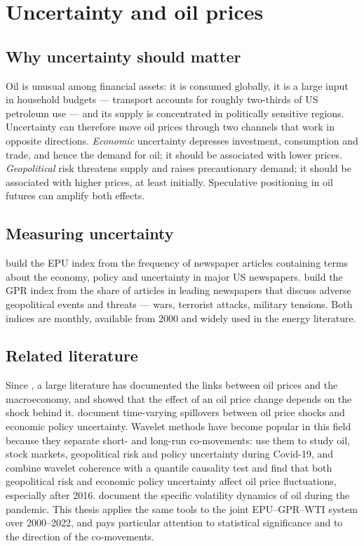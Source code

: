 \documentclass[11pt,a4paper]{article}
\begin{document}
\section{Uncertainty and oil prices}\label{sec:uncertainty}

\subsection{Why uncertainty should matter}

Oil is unusual among financial assets: it is consumed globally, it is a large
input in household budgets --- transport accounts for roughly two-thirds of US
petroleum use --- and its supply is concentrated in politically sensitive
regions. Uncertainty can therefore move oil prices through two channels that
work in opposite directions. \emph{Economic} uncertainty depresses investment,
consumption and trade, and hence the demand for oil; it should be associated
with lower prices. \emph{Geopolitical} risk threatens supply and raises
precautionary demand; it should be associated with higher prices, at least
initially. Speculative positioning in oil futures can amplify both effects.

\subsection{Measuring uncertainty}

\citet{baker2016} build the EPU index from the frequency of newspaper articles
containing terms about the economy, policy and uncertainty in major US
newspapers. \citet{caldara2022} build the GPR index from the share of articles
in leading newspapers that discuss adverse geopolitical events and threats ---
wars, terrorist attacks, military tensions. Both indices are monthly, available
from 2000 and widely used in the energy literature.

\subsection{Related literature}

Since \citet{hamilton1983}, a large literature has documented the links between
oil prices and the macroeconomy, and \citet{kilian2009} showed that the effect of
an oil price change depends on the shock behind it. \citet{antonakakis2014} document
time-varying spillovers between oil price shocks and economic policy
uncertainty. Wavelet methods have become
popular in this field because they separate short- and long-run co-movements:
\citet{sharif2020} use them to study oil, stock markets, geopolitical risk and
policy uncertainty during Covid-19, and \citet{wang2022} combine wavelet
coherence with a quantile causality test and find that both geopolitical risk
and economic policy uncertainty affect oil price fluctuations, especially after
2016. \citet{bourghelle2021} document the specific volatility dynamics of oil
during the pandemic. This thesis applies the same tools to the joint
EPU--GPR--WTI system over 2000--2022, and pays particular attention to
statistical significance and to the direction of the co-movements.
\end{document}
